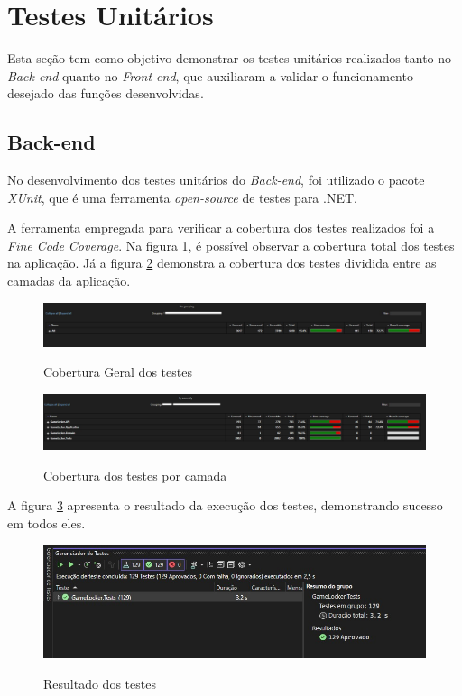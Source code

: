 \section{Testes Unitários}
Esta seção tem como objetivo demonstrar os testes unitários realizados tanto no \textit{\gls{Back-end}} quanto no \textit{\gls{Front-end}}, que auxiliaram a validar o funcionamento desejado das funções desenvolvidas.

\subsection{Back-end}
No desenvolvimento dos testes unitários do \textit{\gls{Back-end}}, foi utilizado o pacote \textit{XUnit}, que é uma ferramenta \textit{open-source} de testes para \gls{.NET}.

A ferramenta empregada para verificar a cobertura dos testes realizados foi a \textit{Fine Code Coverage}. Na figura \ref{coverageGeralBack}, é possível observar a cobertura total dos testes na aplicação. Já a figura \ref{coverageBack} demonstra a cobertura dos testes dividida entre as camadas da aplicação.

\begin{figure}[H]
    \caption{Cobertura Geral dos testes}
	\centering
	\includegraphics[width=1\textwidth]{imagens/testes/TestesUnitariosBackend/coverageGeral.jpeg}
    \label{coverageGeralBack}
\end{figure}

\begin{figure}[H]
    \caption{Cobertura dos testes por camada}
	\centering
	\includegraphics[width=1\textwidth]{imagens/testes/TestesUnitariosBackend/coverage.jpeg}
	\label{coverageBack}
\end{figure}
\pagebreak

A figura \ref{resultadoTestesBack} apresenta o resultado da execução dos testes, demonstrando sucesso em todos eles.

\begin{figure}[H]
    \caption{Resultado dos testes}
	\centering
	\includegraphics[width=1\textwidth]{imagens/testes/TestesUnitariosBackend/resultado.jpeg}
    \label{resultadoTestesBack}
\end{figure}

